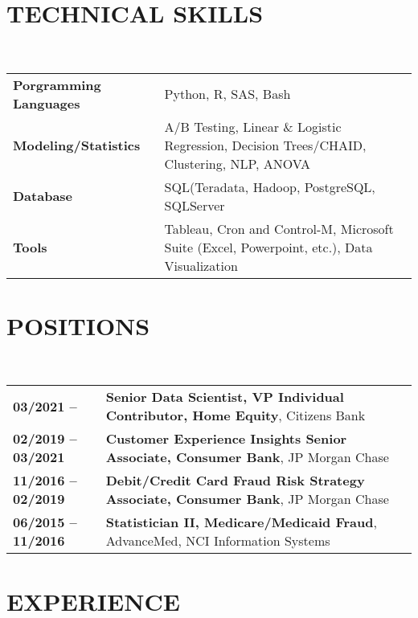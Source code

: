 \documentclass[a4paper,11pt]{article}
\begin{document}
\maketitle

\vspace{1pt}
\section{TECHNICAL SKILLS}
~\begin{tabular}{lP{15cm}}\parskip=0cm
\textbf{Porgramming Languages} & {Python, R, SAS, Bash}\\
\textbf{Modeling/Statistics} & {A/B Testing, Linear \& Logistic Regression, Decision Trees/CHAID, Clustering, NLP, ANOVA}\\
\textbf{Database} & {SQL(Teradata, Hadoop, PostgreSQL, SQLServer}\\
\textbf{Tools} & {Tableau, Cron and Control-M, Microsoft Suite (Excel, Powerpoint, etc.), Data Visualization}\\
  \end{tabular}

\section{POSITIONS}

~\begin{tabular}{lP{15cm}}
\textbf{03/2021 --}& \textbf{Senior Data Scientist, VP Individual Contributor, Home Equity},
        Citizens Bank\\
\textbf{02/2019 -- 03/2021}& \textbf{Customer Experience Insights Senior Associate, Consumer Bank},
        JP Morgan Chase\\
\textbf{11/2016 -- 02/2019}& \textbf{Debit/Credit Card Fraud Risk Strategy Associate, Consumer Bank},
        JP Morgan Chase\\
\textbf{06/2015 -- 11/2016}& \textbf{Statistician II, Medicare/Medicaid Fraud}, 
        AdvanceMed, NCI Information Systems \\
  \end{tabular}

\section{EXPERIENCE}
\end{document}
